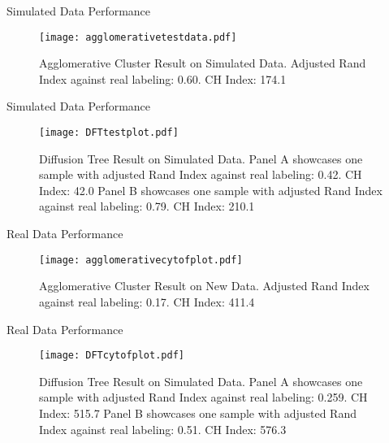 \documentclass{beamer}
\begin{document}
	\begin{frame}{Simulated Data Performance}
		\begin{figure}[htbp]
			\centering
			\texttt{[image: agglomerativetestdata.pdf]}
			\caption*{Agglomerative Cluster Result on Simulated Data. Adjusted Rand Index against real labeling: 0.60. CH Index: 174.1}
		\end{figure}
	\end{frame}
	
	\begin{frame}{Simulated Data Performance}
		\begin{figure}[htbp]
			\centering
			\texttt{[image: DFTtestplot.pdf]}
			\caption*{Diffusion Tree Result on Simulated Data. Panel A showcases one sample with adjusted Rand Index against real labeling: 0.42. CH Index: 42.0 Panel B showcases one sample with adjusted Rand Index against real labeling: 0.79. CH Index: 210.1}
		\end{figure}
	\end{frame}
	
	\begin{frame}{Real Data Performance}
		\begin{figure}[htbp]
			\centering
			\texttt{[image: agglomerativecytofplot.pdf]}
			\caption*{Agglomerative Cluster Result on New Data. Adjusted Rand Index against real labeling: 0.17. CH Index: 411.4}
		\end{figure}
	\end{frame}
	
	\begin{frame}{Real Data Performance}
		\begin{figure}[htbp]
			\centering
			\texttt{[image: DFTcytofplot.pdf]}
			\caption*{Diffusion Tree Result on Simulated Data. Panel A showcases one sample with adjusted Rand Index against real labeling: 0.259. CH Index: 515.7 Panel B showcases one sample with adjusted Rand Index against real labeling: 0.51. CH Index: 576.3}
		\end{figure}
	\end{frame}
\end{document}
